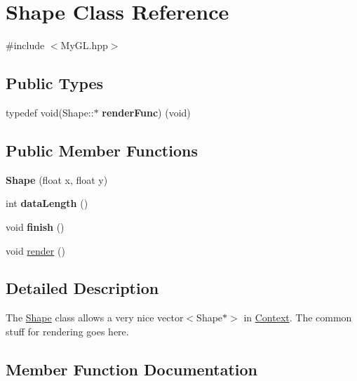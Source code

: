 \hypertarget{classShape}{}\section{Shape Class Reference}
\label{classShape}


{\ttfamily \#include $<$My\+G\+L.\+hpp$>$}

\subsection*{Public Types}
\begin{DoxyCompactItemize}
\item 
\hypertarget{classShape_ab0227d9b119beea793bce34ba3e0b5b8}{}typedef void(Shape\+::$\ast$ {\bfseries render\+Func}) (void)\label{classShape_ab0227d9b119beea793bce34ba3e0b5b8}

\end{DoxyCompactItemize}
\subsection*{Public Member Functions}
\begin{DoxyCompactItemize}
\item 
\hypertarget{classShape_a1b3bc50a2d114a27f144a834e7f0af64}{}{\bfseries Shape} (float x, float y)\label{classShape_a1b3bc50a2d114a27f144a834e7f0af64}

\item 
\hypertarget{classShape_a0098f3d6067b650de0b5e34f44a9257f}{}int {\bfseries data\+Length} ()\label{classShape_a0098f3d6067b650de0b5e34f44a9257f}

\item 
\hypertarget{classShape_a3651abfa2b1d449f35c83b3dc64f64f2}{}void {\bfseries finish} ()\label{classShape_a3651abfa2b1d449f35c83b3dc64f64f2}

\item 
void \hyperlink{classShape_ad62ee6dbad795d967e2f572f6e4e27fb}{render} ()
\end{DoxyCompactItemize}


\subsection{Detailed Description}
The \hyperlink{classShape}{Shape} class allows a very nice vector$<$\+Shape$\ast$$>$ in \hyperlink{classContext}{Context}. The common stuff for rendering goes here. 

\subsection{Member Function Documentation}
\hypertarget{classShape_ad62ee6dbad795d967e2f572f6e4e27fb}{}
